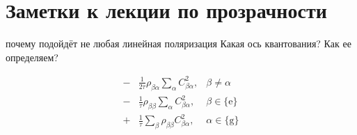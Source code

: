 \setcounter{section}{2}
\section{Заметки к лекции по прозрачности}

почему подойдёт не любая линейная поляризация
Какая ось квантования? Как ее определяем?

\begin{equation*}
	\left.\begin{aligned}
    	- &\frac{1}{2\tau}\rho_{\beta \alpha} \sum_{\alpha} C_{\beta \alpha}^2,
    	&\beta \neq \alpha \\
		- &\frac{1}{\tau} \rho_{\beta \beta} \sum_\alpha C_{\beta \alpha}^2,
		&\beta \in \{\text{e}\} \\
		+ &\frac{1}{\tau} \sum_\beta \rho_{\beta \beta}  C_{\beta \alpha}^2 ,
		&\alpha \in \{\text{g}\} \\
	\end{aligned}\right.
\end{equation*}